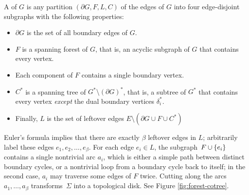 \documentclass[11pt,twoside]{article}
\begin{document}
A  of $G$ is any partition $(\partial\! G, F, L, C)$ of the edges of $G$ into four edge-disjoint subgraphs with the following properties:
\begin{itemize}\itemsep0pt
\item $\partial\! G$ is the set of all boundary edges of $G$.
\item $F$ is a spanning forest of $G$, that is, an acyclic subgraph of $G$ that contains every vertex.
\item Each component of $F$ contains a single boundary vertex.
\item $C^*$ is a spanning tree of $G^*\setminus (\partial G)^*$, that is, a subtree of $G^*$ that contains every vertex \emph{except} the dual boundary vertices $\delta_i^*$.
\item Finally, $L$ is the set of leftover edges $E \setminus (\partial\!G \cup F \cup C^*)$
\end{itemize}

\noindent
Euler's formula implies that there are exactly $\beta$ leftover edges in $L$; arbitrarily label these edges $e_1, e_2, \dots, e_\beta$.  For each edge $e_i\in L$, the subgraph~$F\cup \{ e_i \}$ contains a single nontrivial arc $a_i$, which is either a simple path between distinct boundary cycles, or a nontrivial loop from a boundary cycle back to itself; in the second case, $a_i$ may traverse some edges of $F$ twice.  Cutting along the arcs $a_1, \dots, a_\beta$ transforms~$\Sigma$ into a topological disk. See Figure \ref{fig:forest-cotree}.
\end{document}
